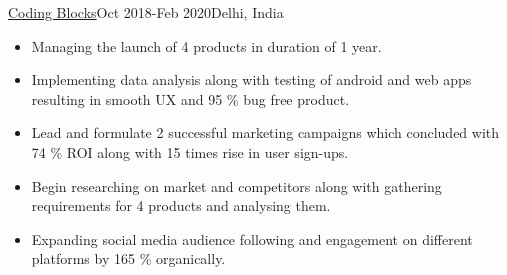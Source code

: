 \documentclass[10pt,a4paper,ragged2e]{altacv}
\begin{document}
 {\color{mecol}\href{https://codingblocks.com}{Coding Blocks}}{Oct 2018-Feb 2020}{Delhi, India}
\begin{itemize}
\item {Managing the launch of 4 products in duration of 1 year. }
\item {Implementing data analysis along with testing of android and web apps resulting in smooth UX and 95 \% bug free product.}
\item { Lead and formulate 2 successful marketing campaigns which concluded with 74 \% ROI along with 15 times rise in user sign-ups.}
\item {Begin researching on market and competitors along with gathering requirements for 4 products and analysing them.}
\item {Expanding social media audience following and engagement on different platforms by 165 \% organically.}

\end{itemize}

    



    



\end{document}
